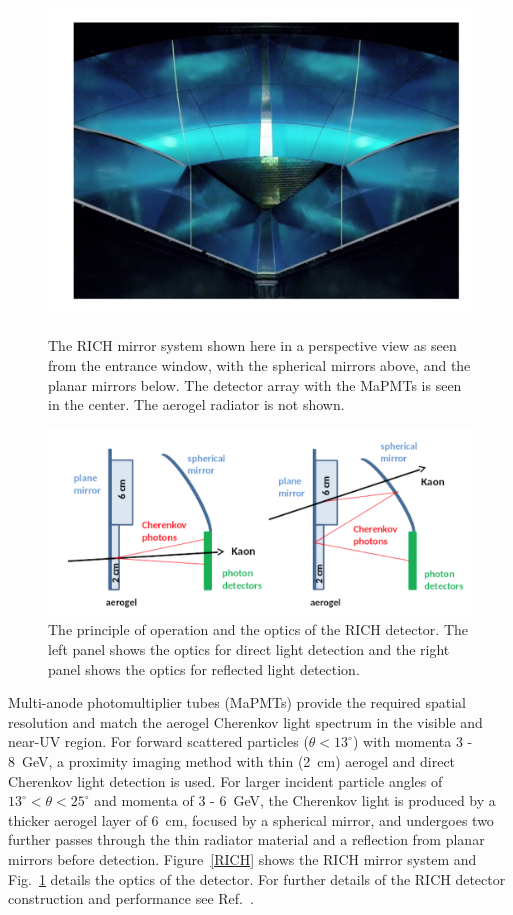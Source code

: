 \documentclass[final,3p,twocolumn]{elsarticle}
\begin{document}
\begin{figure}[t!]
\centerline{\includegraphics[width=1.0\columnwidth]{rich-mirrors.png}}
\caption{The RICH mirror system shown here in a perspective view as seen from the entrance window, with the
  spherical mirrors above, and the planar mirrors below. The detector array with the MaPMTs is seen in the center.
  The aerogel radiator is not shown.}
\label{RICH}
\includegraphics[width=1.0\columnwidth]{rich.png}
\caption{The principle of operation and the optics of the RICH detector. The left panel shows the optics for direct
  light detection and the right panel shows the optics for reflected light detection.}
\label{RICH-optics}
\end{figure}

Multi-anode photomultiplier tubes (MaPMTs) provide the required spatial resolution and match the aerogel
Cherenkov light spectrum in the visible and near-UV region. For forward scattered particles ($\theta < 13^\circ$)
with momenta 3 - 8~GeV, a proximity imaging method with thin (2~cm) aerogel and direct Cherenkov light detection
is used. For larger incident particle angles of $13^\circ < \theta < 25^\circ$ and momenta of 3 - 6~GeV, the Cherenkov
light is produced by a thicker aerogel layer of 6~cm, focused by a spherical mirror, and undergoes two further passes
through the thin radiator material and a reflection from planar mirrors before detection. Figure~\ref{RICH} shows
the RICH mirror system and Fig.~\ref{RICH-optics} details the optics of the detector. For further details of the
RICH detector construction and performance see Ref.~\cite{RICH}.
\end{document}
